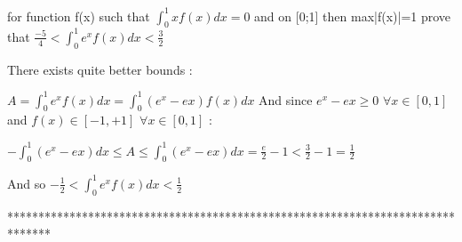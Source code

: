\begin{solution}
	\begin{tcolorbox}for function f(x) such that $\int_{0}^{1}xf(x)dx=0$ and on [0;1] then max|f(x)|=1 prove that $\frac{-5}{4}<\int_{0}^{1}e^xf(x)dx<\frac{3}{2}$\end{tcolorbox}
There exists quite better bounds :

$A=\int_0^1e^xf(x)dx=\int_0^1(e^x-ex)f(x)dx$ 
And since $e^x-ex\ge 0$ $\forall x\in[0,1]$ and $f(x)\in[-1,+1]$ $\forall x\in[0,1]$ :

$-\int_0^1(e^x-ex)dx\le A\le \int_0^1(e^x-ex)dx=\frac e2-1<\frac 32-1=\frac 12$

And so $\boxed{-\frac 12<\int_0^1e^xf(x)dx<\frac 12}$



\end{solution}
*******************************************************************************
